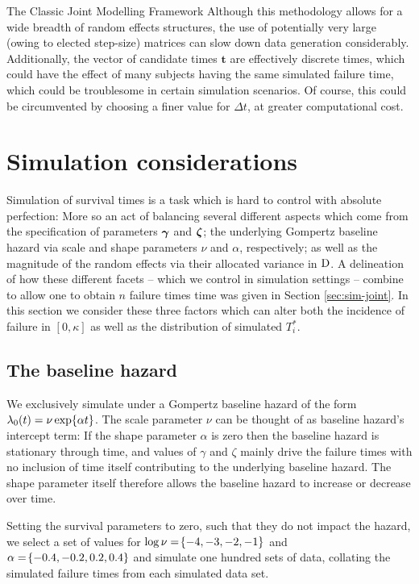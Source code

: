 \begin{chapter}{\label{cha:methods-classic}The Classic Joint Modelling Framework}
  Although this methodology allows for a wide breadth of random effects structures, the use of potentially very large (owing to elected step-size) matrices can slow down data generation considerably. Additionally, the vector of candidate times $\bm{t}$ are effectively discrete times, which could have the effect of many subjects having the same simulated failure time, which could be troublesome in certain simulation scenarios. Of course, this could be circumvented by choosing a finer value for $\Delta t$, at greater computational cost.
  
  \section{\label{sec:sim-considerations}Simulation considerations}
  Simulation of survival times is a task which is hard to control with absolute perfection: More so an act of balancing several different aspects which come from the specification of parameters $\bm{\gamma}$ and $\bm{\zeta}$; the underlying Gompertz baseline hazard via scale and shape parameters $\nu$ and $\alpha$, respectively; as well as the magnitude of the random effects via their allocated variance in $\mathrm{D}$. A delineation of how these different facets -- which we control in simulation settings -- combine to allow one to obtain $n$ failure times time was given in Section \ref{sec:sim-joint}. In this section we consider these three factors which can alter both the incidence of failure in $[0,\kappa]$ as well as the distribution of simulated $T_i^*$.
  
  \subsection{The baseline hazard}\label{sec:sim-considerations-basehaz}
  We exclusively simulate under a Gompertz baseline hazard of the form $\lambda_0(t)=\nu\exp\!\left\{\alpha t\right\}$. The scale parameter $\nu$ can be thought of as baseline hazard's intercept term: If the shape parameter $\alpha$ is zero then the baseline hazard is stationary through time, and values of $\gamma$ and $\zeta$ mainly drive the failure times with no inclusion of time itself contributing to the underlying baseline hazard. The shape parameter itself therefore allows the baseline hazard to increase or decrease over time.
  
  Setting the survival parameters to zero, such that they do not impact the hazard, we select a set of values for $\log\nu=\!\left\{-4,-3,-2,-1\right\}$ and $\alpha=\!\left\{-0.4, -0.2, 0.2, 0.4\right\}$ and simulate one hundred sets of data, collating the simulated failure times from each simulated data set. 
  

\end{chapter}
